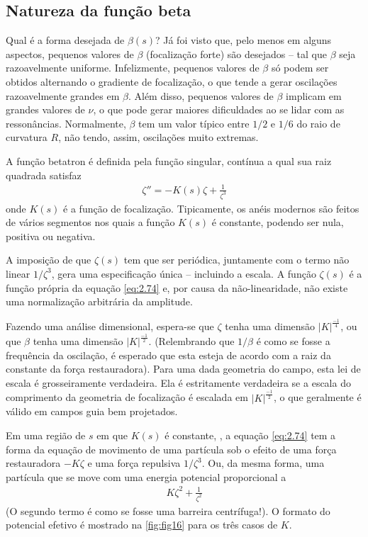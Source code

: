 \subsection{Natureza da função beta}
Qual é a forma desejada de $\beta(s)$? Já foi visto que, pelo menos em alguns aspectos, pequenos valores de $\beta$ (focalização forte) são desejados -- tal que $\beta$ seja razoavelmente uniforme. Infelizmente, pequenos valores de $\beta$ só podem ser obtidos alternando o gradiente de focalização, o que tende a gerar oscilações razoavelmente grandes em $\beta$. Além disso, pequenos valores de $\beta$ implicam em grandes valores de $\nu$, o que pode gerar maiores dificuldades ao se lidar com as ressonâncias. Normalmente, $\beta$ tem um valor típico entre $1/2$ e $1/6$ do raio de curvatura $R$, não tendo, assim, oscilações muito extremas.

A função betatron é definida pela função singular, contínua a qual sua raiz quadrada satisfaz
\begin{align}
	\zeta'' = -K(s)\zeta + \frac{1}{\zeta^3}\label{eq:2.74}
\end{align}
onde $K(s)$ é a função de focalização. Tipicamente, os anéis modernos são feitos de vários segmentos nos quais a função $K(s)$ é constante, podendo ser nula, positiva ou negativa.

A imposição de que $\zeta(s)$ tem que ser periódica, juntamente com o termo não linear $1/\zeta^3$, gera uma especificação única -- incluindo a escala. A função $\zeta(s)$ é a função própria da equação \eqref{eq:2.74} e, por causa da não-linearidade, não existe uma normalização arbitrária da amplitude.

Fazendo uma análise dimensional, espera-se que $\zeta$ tenha uma dimensão $|K|^\frac{-1}{4}$, ou que $\beta$ tenha uma dimensão $|K|^\frac{-1}{2}$. (Relembrando que $1/\beta$ é como se fosse a frequência da oscilação, é esperado que esta esteja de acordo com a raiz da constante da força restauradora). Para uma dada geometria do campo, esta lei de escala é grosseiramente verdadeira. Ela é estritamente verdadeira se a escala do comprimento da geometria de focalização é escalada em $|K|^\frac{-1}{2}$, o que geralmente é válido em campos guia bem projetados.

Em uma região de $s$ em que $K(s)$ é constante, , a equação \eqref{eq:2.74} tem a forma da equação de movimento de uma partícula sob o efeito de uma força restauradora $-K\zeta$ e uma força repulsiva $1/\zeta^3$. Ou, da mesma forma, uma partícula que se move com uma energia potencial proporcional a
\begin{align}
	K\zeta^2 + \frac{1}{\zeta^2}
\end{align}
(O segundo termo é como se fosse uma barreira centrífuga!). O formato do potencial efetivo é mostrado na \autoref{fig:fig16} para os três casos de $K$.

